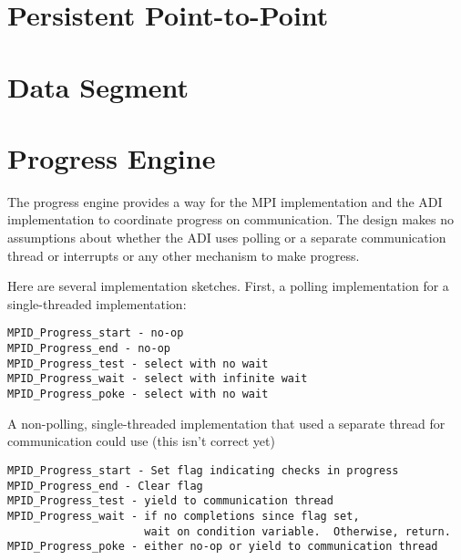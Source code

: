\documentclass{article}
\begin{document}
\section{Persistent Point-to-Point}






\section{Data Segment}
\label{sec:segment-fcns}






\section{Progress Engine}
The progress engine provides a way for the MPI implementation and the
ADI implementation to coordinate progress on communication.  The
design makes no assumptions about whether the ADI uses polling or a
separate communication thread or interrupts or any other mechanism to
make progress.  

Here are several implementation sketches.
First, a polling implementation for a single-threaded implementation:
\begin{verbatim}
MPID_Progress_start - no-op
MPID_Progress_end - no-op
MPID_Progress_test - select with no wait
MPID_Progress_wait - select with infinite wait
MPID_Progress_poke - select with no wait
\end{verbatim}

A non-polling, single-threaded implementation that used a separate
thread for communication could use (this isn't correct yet)
\begin{verbatim}
MPID_Progress_start - Set flag indicating checks in progress
MPID_Progress_end - Clear flag
MPID_Progress_test - yield to communication thread
MPID_Progress_wait - if no completions since flag set, 
                     wait on condition variable.  Otherwise, return.
MPID_Progress_poke - either no-op or yield to communication thread
\end{verbatim}






\end{document}
